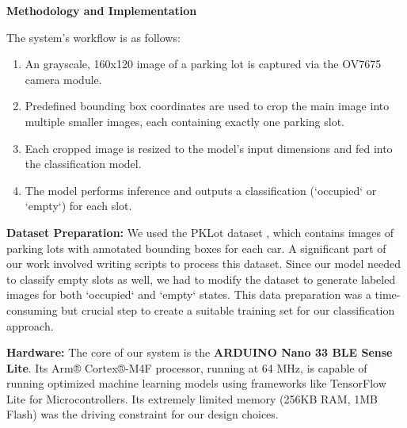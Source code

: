 \documentclass[sigconf,10pt,nonacm]{acmart}
\begin{document}
\noindent\textbf{Methodology and Implementation}

The system's workflow is as follows:
\begin{enumerate}
    \item An grayscale, 160x120 image of a parking lot is captured via the OV7675 camera module. 
    \item Predefined bounding box coordinates are used to crop the main image into multiple smaller images, each containing exactly one parking slot.
    \item Each cropped image is resized to the model's input dimensions and fed into the classification model.
    \item The model performs inference and outputs a classification (`occupied` or `empty`) for each slot.
\end{enumerate}

\noindent\textbf{Dataset Preparation:} We used the PKLot dataset \cite{pklot}, which contains images of parking lots with annotated bounding boxes for each car. A significant part of our work involved writing scripts to process this dataset. Since our model needed to classify empty slots as well, we had to modify the dataset to generate labeled images for both `occupied` and `empty` states. This data preparation was a time-consuming but crucial step to create a suitable training set for our classification approach.

\noindent\textbf{Hardware:} The core of our system is the \textbf{ARDUINO Nano 33 BLE Sense Lite}. Its Arm® Cortex®-M4F processor, running at 64 MHz, is capable of running optimized machine learning models using frameworks like TensorFlow Lite for Microcontrollers. Its extremely limited memory (256KB RAM, 1MB Flash) was the driving constraint for our design choices.
\end{document}
